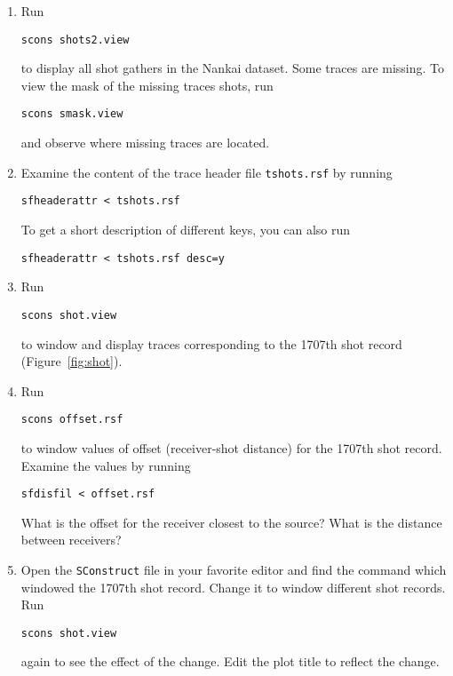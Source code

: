 \begin{enumerate}
\item Run
\begin{verbatim}
scons shots2.view 
\end{verbatim}
to display all shot gathers in the Nankai dataset. Some traces are missing. 
To view the mask of the missing traces shots, run 
\begin{verbatim}
scons smask.view 
\end{verbatim}
and observe where missing traces are located.      

\item Examine the content of the trace header file \texttt{tshots.rsf} by running
\begin{verbatim}
sfheaderattr < tshots.rsf
\end{verbatim}
To get a short description of different keys, you can also run
\begin{verbatim}
sfheaderattr < tshots.rsf desc=y
\end{verbatim}      

\item Run
\begin{verbatim}
scons shot.view
\end{verbatim}
to window and display traces corresponding to the 1707th shot record (Figure~\ref{fig:shot}).
\item Run
\begin{verbatim}
scons offset.rsf
\end{verbatim}
to window values of offset (receiver-shot distance) for the 1707th shot record. Examine the values by running
\begin{verbatim}
sfdisfil < offset.rsf
\end{verbatim}
What is the offset for the receiver closest to the source? What is the distance between receivers? 

\answer{
}       


\item Open the \texttt{SConstruct} file in your favorite editor and find the command which windowed the 1707th shot record. Change it 
to window different shot records. Run
\begin{verbatim}
scons shot.view 
\end{verbatim}
again to see the effect of the change. Edit the plot title to reflect the change.

\end{enumerate}


